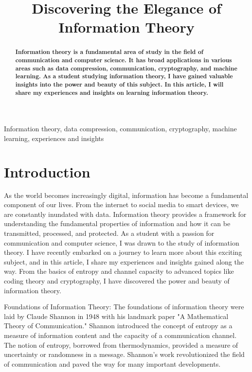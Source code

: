 \documentclass[a4paper,conference]{IEEEtran}
\begin{document}
	
	\title{Discovering the Elegance of Information Theory}
	
	\author{
	}
	
	\maketitle

\begin{abstract}
	\textbf{Information theory is a fundamental area of study in the field of communication and computer science. It has broad applications in various areas such as data compression, communication, cryptography, and machine learning. As a student studying information theory, I have gained valuable insights into the power and beauty of this subject. In this article, I will share my experiences and insights on learning information theory.}
\end{abstract}



\begin{IEEEkeywords}
	Information theory, data compression, communication, cryptography, machine learning, experiences and insights
\end{IEEEkeywords}

\section{Introduction}
As the world becomes increasingly digital, information has become a fundamental component of our lives. From the internet to social media to smart devices, we are constantly inundated with data. Information theory provides a framework for understanding the fundamental properties of information and how it can be transmitted, processed, and protected. As a student with a passion for communication and computer science, I was drawn to the study of information theory. I have recently embarked on a journey to learn more about this exciting subject, and in this article, I share my experiences and insights gained along the way. From the basics of entropy and channel capacity to advanced topics like coding theory and cryptography, I have discovered the power and beauty of information theory. 

Foundations of Information Theory: The foundations of information theory were laid by Claude Shannon in 1948 with his landmark paper "A Mathematical Theory of Communication." Shannon introduced the concept of entropy as a measure of information content and the capacity of a communication channel. The notion of entropy, borrowed from thermodynamics, provided a measure of uncertainty or randomness in a message. Shannon's work revolutionized the field of communication and paved the way for many important developments.
\end{document}
